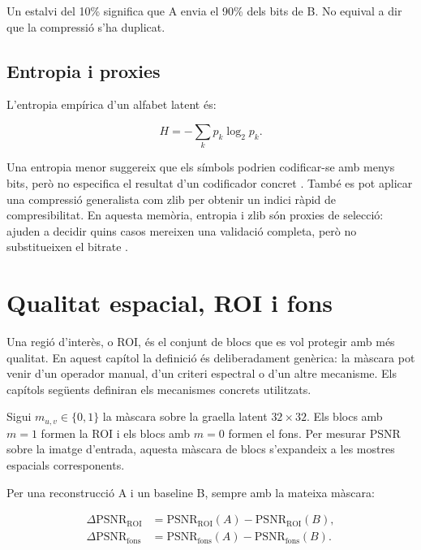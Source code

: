 Un estalvi del 10\% significa que A envia el 90\% dels bits de B. No equival a
dir que la compressió s'ha duplicat.

\subsection{Entropia i proxies}

L'entropia empírica d'un alfabet latent és:

\begin{equation}
H=-\sum_k p_k\log_2 p_k.
\label{eq:entropy}
\end{equation}

Una entropia menor suggereix que els símbols podrien codificar-se amb menys
bits, però no especifica el resultat d'un codificador concret
\cite{cover2006information}. També es pot aplicar una compressió generalista
com zlib per obtenir un indici ràpid de compresibilitat. En aquesta memòria,
entropia i zlib són proxies de selecció: ajuden a decidir quins casos mereixen
una validació completa, però no substitueixen el bitrate .

\section{Qualitat espacial, ROI i fons}\label{sec:roi_metrics}

Una regió d'interès, o ROI, és el conjunt de blocs que es vol protegir amb més
qualitat. En aquest capítol la definició és deliberadament genèrica: la màscara
pot venir d'un operador manual, d'un criteri espectral o d'un altre mecanisme.
Els capítols següents definiran els mecanismes concrets utilitzats.

Sigui $m_{u,v}\in\{0,1\}$ la màscara sobre la graella latent
$32\times32$. Els blocs amb $m=1$ formen la ROI i els blocs amb $m=0$ formen el
fons. Per mesurar PSNR sobre la imatge d'entrada, aquesta màscara de blocs
s'expandeix a les mostres espacials corresponents.

Per una reconstrucció A i un baseline B, sempre amb la mateixa màscara:

\begin{align}
\Delta\mathrm{PSNR}_{\mathrm{ROI}}
&=\mathrm{PSNR}_{\mathrm{ROI}}(A)
-\mathrm{PSNR}_{\mathrm{ROI}}(B),\\
\Delta\mathrm{PSNR}_{\mathrm{fons}}
&=\mathrm{PSNR}_{\mathrm{fons}}(A)
-\mathrm{PSNR}_{\mathrm{fons}}(B).
\label{eq:roi_bg_deltas}
\end{align}

